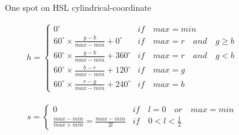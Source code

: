 \documentclass[conference]{IEEEtran}
\begin{document}
\begin{figure} \centering
	\caption{One spot on HSL cylindrical-coordinate}
\end{figure}

\begin{equation}
	\begin{split}
	h=
		\begin{cases}
		 0^{\circ}  &if \quad max = min\\
		 60^{\circ} \times \frac{g-b}{max-min} + 0^{\circ} &if \quad max = r \quad and \quad g \ge b \\
		 60^{\circ} \times \frac{g-b}{max-min} + 360^{\circ} &if \quad max = r \quad and \quad g < b \\
		 60^{\circ} \times \frac{b-r}{max-min} + 120^{\circ} &if \quad max = g \\
		 60^{\circ} \times \frac{r-g}{max-min} + 240^{\circ} &if \quad max = b 
		\end{cases}	
	\end{split}
\end{equation}	

\begin{equation}
\begin{split}
	s = 
		\begin{cases}
		0 &if \quad l = 0 \quad or \quad max = min\\
		\frac{max-min}{max+min}=\frac{max-min}{2l} &if \quad 0<l<\frac{1}{2}
		\end{cases}	
	\end{split}
\end{equation}
\end{document}

